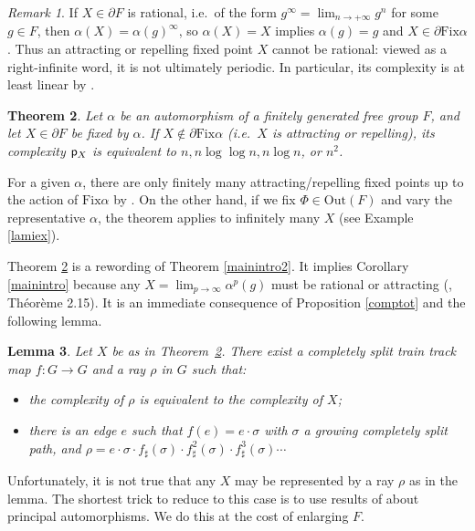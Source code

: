 \documentclass[11pt]{amsart}
\newtheorem{thm}{Theorem}[section]
\newtheorem{lem}[thm]{Lemma}
\theoremstyle{remark}
\newtheorem{rem}[thm]{Remark}
\newcommand{\Fix}{{\mathrm{Fix}}}
\newcommand{\Out} {{\mathrm{Out}}}
\newcommand{\cp}{{\sf  p}}
\newcommand{\bo}{\partial}
\begin{document}
\begin{rem} \label {pasper}
If   $X\in\bo F$ is  rational, i.e.\ of the form $g^\infty=\lim_{n\to+\infty}g^n$ for some  $g\in F$, then $\alpha(X)=\alpha(g)^\infty$, so  $\alpha(X)=X$   implies $\alpha(g)=g$ and $X\in \bo \Fix\alpha$. Thus 
an attracting or repelling fixed point  $X$ cannot be rational:
 viewed as  a right-infinite word,  it  is not ultimately periodic. In particular, its complexity is at least linear by      \cite{morse}.
 \end{rem}
 
\begin{thm} \label{main}
Let $\alpha$ be an automorphism of a finitely generated free group $F$, and let $X\in\bo F$ be fixed by $\alpha$. If $X\notin\bo\Fix\alpha$ (i.e.\ $X$ is attracting or repelling), its complexity $\cp_X$ is equivalent to $n,n\log\log n, n\log n$, or $n^2$.
\end{thm}

   For a given $\alpha$, there are only finitely many attracting/repelling fixed points  
up to the action of $ \Fix\alpha$  by \cite{cooper}. On the other hand, if we fix $\Phi\in\Out(F)$ and vary the representative $\alpha$, the theorem applies to infinitely many $X$ (see Example \ref{lamiex}).


   Theorem \ref{main}  is a rewording of Theorem \ref{mainintro2}. It implies   Corollary  \ref{mainintro} because any $X=\lim_{p\to\infty}\alpha^p(g)$ must be rational or attracting (\cite{these}, Th\'eor\`eme 2.15). 
   It is an immediate consequence of  Proposition \ref{comptot} and the following lemma. 

\begin{lem} \label{morceaux}
Let $X$ be as in 
Theorem~\ref{main}.
There exist a   completely split train track map $f:G\to G$ and a ray $\rho$ in $G$ such that:
\begin{itemize}
 \item the complexity of $\rho$ is equivalent to the complexity of $X$;

 \item 
 there is an edge $e$ such that $f(e)=e\cdot\sigma$ with $\sigma$ a growing completely split path, and $\rho=e\cdot\sigma \cdot f_\sharp (\sigma)\cdot f^2_\sharp(\sigma)\cdot f^3_\sharp(\sigma)\cdots$
\end{itemize}
 \end{lem}

 Unfortunately, it is not true that any $X$ may be represented by a ray $\rho$ as in the lemma. The shortest trick to reduce to this case is to use results of \cite{recogn} about principal automorphisms. We do this at the cost of enlarging $F$.
\end{document}
